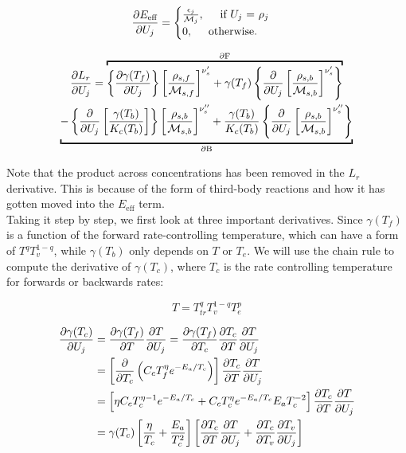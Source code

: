 \documentclass[10pt]{article}
\begin{document}
\begin{flushleft}
\begin{equation}
    \frac{\partial E_\text{eff}}{\partial U_j} = 
    \begin{cases}
        \frac{\epsilon_j}{\mathcal{M}_j}, \hspace{5mm} \text{if $U_j$ = $\rho_j$}
        \\ 0, \hspace{5mm} \text{otherwise.}
    \end{cases}
\end{equation}

\begin{multline}
    \pd{L_r}{U_j} = \overbracket{\bcb{ \pd{\gamma(T_f)}{U_j}} \bb{\frac{\rho_{s,f}}{\mathcal{M}_{s,f}}}^{\nu_s'} + \gamma(T_f) \bcb{\pd{}{U_j} \bb{\frac{\rho_{s,b}}{\mathcal{M}_{s,b}}}^{\nu_s'}}}^{\partial \text{F}}
    \\ \underbracket{- \bcb{\pd{}{U_j} \bb{\frac{\gamma(T_b)}{K_c(T_b)}}} \bb{\frac{\rho_{s,b}}{\mathcal{M}_{s,b}}}^{\nu_s''} + \frac{\gamma(T_b)}{K_c(T_b)} \bcb{\pd{}{U_j} \bb{\frac{\rho_{s,b}}{\mathcal{M}_{s,b}}}^{\nu_s''}}}_{\partial \text{B}}
\end{multline}

Note that the product across concentrations has been removed in the $L_r$ derivative. This is because of the form of third-body reactions and how it has gotten moved into the $E_\text{eff}$ term.
\\
\vspace{5mm}
 Taking it step by step, we first look at three important derivatives. Since $\gamma(T_f)$ is a function of the forward rate-controlling temperature, which can have a form of $T^q T_v^{1-q}$, while $\gamma(T_b)$ only depends on $T$ or $T_e$. We will use the chain rule to compute the derivative of $\gamma(T_c)$, where $T_c$ is the rate controlling temperature for forwards or backwards rates:

\begin{equation}
    T = T_{tr}^q T_v^{1-q} T_e^p
\end{equation}

\begin{align}
    \frac{\partial \gamma(T_c)}{\partial U_j} &= \frac{\partial \gamma(T_f)}{\partial T} \frac{\partial T}{\partial U_j} = \frac{\partial \gamma(T_f)}{\partial T_c} \frac{\partial T_c}{\partial T} \frac{\partial T}{\partial U_j}
    \\ &= \left[ \frac{\partial }{\partial T_c} \left( C_c T_f^\eta e^{-E_a / T_c} \right) \right] \frac{\partial T_c}{\partial T} \frac{\partial T}{\partial U_j}
    \\ &= \left[ \eta C_c T_c^{\eta - 1} e^{-E_a / T_c} + C_c T_c^\eta e^{-E_a / T_c} E_a T_c^{-2} \right] \frac{\partial T_c}{\partial T} \frac{\partial T}{\partial U_j}
    \\ &= \gamma(T_c) \left[ \frac{\eta}{T_c} + \frac{E_a}{T_c^2} \right]  \left[  \frac{\partial T_c}{\partial T}\frac{\partial T}{\partial U_j} + \frac{\partial T_c}{\partial T_v} \frac{\partial T_v}{\partial U_j}  \right]
\end{align}


\end{flushleft}
\end{document}
